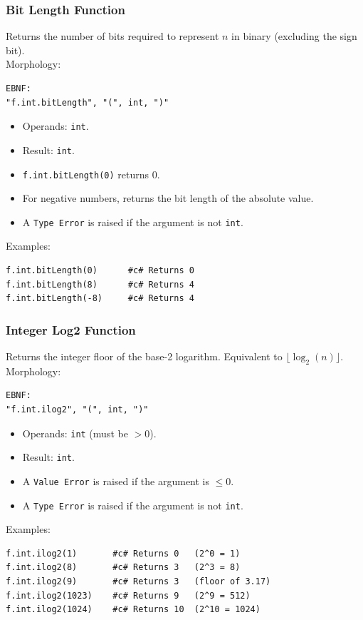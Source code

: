\subsubsection{Bit Length Function}
Returns the number of bits required to represent $n$ in binary (excluding the sign bit). \\
Morphology:
\begin{verbatim}
EBNF:
"f.int.bitLength", "(", int, ")"
\end{verbatim}
\begin{itemize}
\item Operands: \texttt{int}.
\item Result: \texttt{int}.
\item \texttt{f.int.bitLength(0)} returns 0.
\item For negative numbers, returns the bit length of the absolute value.
\item A \texttt{Type Error} is raised if the argument is not \texttt{int}.
\end{itemize}
Examples:
\begin{verbatim}
f.int.bitLength(0)      #c# Returns 0
f.int.bitLength(8)      #c# Returns 4
f.int.bitLength(-8)     #c# Returns 4
\end{verbatim}

\subsubsection{Integer Log2 Function}
Returns the integer floor of the base-2 logarithm. Equivalent to $\lfloor \log_2(n) \rfloor$. \\
Morphology:
\begin{verbatim}
EBNF:
"f.int.ilog2", "(", int, ")"
\end{verbatim}
\begin{itemize}
\item Operands: \texttt{int} (must be $> 0$).
\item Result: \texttt{int}.
\item A \texttt{Value Error} is raised if the argument is $\leq 0$.
\item A \texttt{Type Error} is raised if the argument is not \texttt{int}.
\end{itemize}
Examples:
\begin{verbatim}
f.int.ilog2(1)       #c# Returns 0   (2^0 = 1)
f.int.ilog2(8)       #c# Returns 3   (2^3 = 8)
f.int.ilog2(9)       #c# Returns 3   (floor of 3.17)
f.int.ilog2(1023)    #c# Returns 9   (2^9 = 512)
f.int.ilog2(1024)    #c# Returns 10  (2^10 = 1024)
\end{verbatim}

